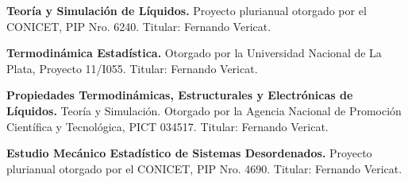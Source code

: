  \textbf{Teoría y Simulación de Líquidos.} Proyecto plurianual otorgado por el CONICET, PIP Nro. 6240. Titular: Fernando Vericat.

 \textbf{Termodinámica Estadística.} Otorgado por la Universidad Nacional de La Plata, Proyecto 11/I055. Titular: Fernando Vericat.

 \textbf{Propiedades Termodinámicas, Estructurales y Electrónicas de Líquidos.} Teoría y Simulación. Otorgado por la Agencia Nacional de Promoción Científica y Tecnológica, PICT 034517. Titular: Fernando Vericat.

 \textbf{Estudio Mecánico Estadístico de Sistemas Desordenados.} Proyecto plurianual otorgado por el CONICET, PIP Nro. 4690. Titular: Fernando Vericat.
